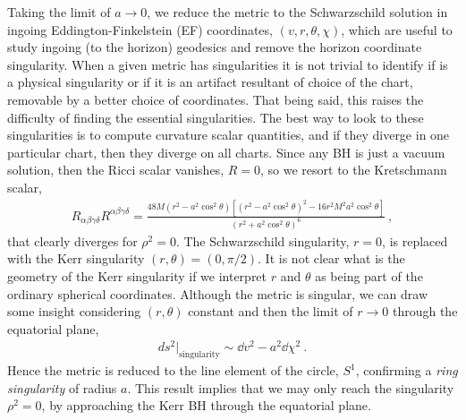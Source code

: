 Taking the limit of $a\to0$, we reduce the metric to the Schwarzschild solution in ingoing Eddington-Finkelstein (EF) coordinates, $(v,r,\theta,\chi)$, which are useful to study ingoing (to the horizon) geodesics and remove the horizon coordinate singularity.
When a given metric has singularities it is not trivial to identify if is a physical singularity or if it is an artifact resultant of choice of the chart, removable by a better choice of coordinates. 
That being said, this raises the difficulty of finding the essential singularities.
The best way to look to these singularities is to compute curvature scalar quantities, and if they diverge in one particular chart, then they diverge on all charts.
Since any BH is just a vacuum solution, then the Ricci scalar vanishes, $R=0$, so we resort to the Kretschmann scalar,
\begin{align}
    R_{\alpha\beta\gamma\delta} R^{\alpha\beta\gamma\delta} = \frac{48 M (r^2 - a^2\cos^2\theta) \left[ (r^2 - a^2\cos^2\theta) ^2 - 16 r^2 M^2 a^2\cos^2\theta \right] }{(r^2 + a^2\cos^2\theta)^6} ~,
    \label{eq2:KerrKretschmann}
\end{align}
that clearly diverges for $\rho^2=0$.
The Schwarzschild singularity, $r=0$, is replaced with the Kerr singularity $(r,\theta)=(0,\pi/2)$.
It is not clear what is the geometry of the Kerr singularity if we interpret $r$ and $\theta$ as being part of the ordinary spherical coordinates.
Although the metric is singular, we can draw some insight considering $(r,\theta)$ constant and then the limit of $r\to0$ through the equatorial plane,
\begin{align}
    {ds^2}\rvert_{\mathrm{singularity}} \sim \dd v^2 - a^2 \dd \chi^2 ~.
    \label{eq2:KerrKretschmann}
\end{align}
Hence the metric is reduced to the line element of the circle, $S^1$, confirming a \emph{ring singularity} of radius $a$.
This result implies that we may only reach the singularity $\rho^2=0$, by approaching the Kerr BH through the equatorial plane. 

